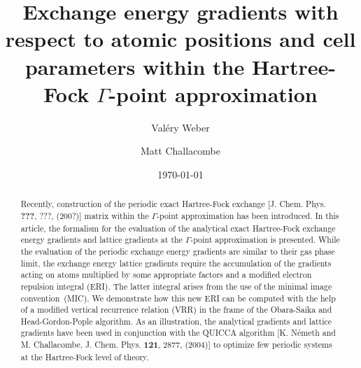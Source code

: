 \documentclass[prl,twocolumn,showpacs,twocolumngrid,superbib]{revtex4}
\begin{document}

\title{Exchange energy gradients with respect to atomic positions and cell parameters
  within the Hartree-Fock $\Gamma$-point approximation}

\author{Val\'ery Weber}
%
\author{Matt Challacombe}%
%

\date{\today}%

\begin{abstract}
  Recently, construction of the periodic exact Hartree-Fock exchange 
  [J. Chem. Phys. {\bf ???}, ???, (200?)]
  matrix within the $\Gamma$-point approximation
  has been introduced. In this article, the formalism for the evaluation of 
  the analytical exact Hartree-Fock exchange energy gradients and lattice gradients at 
  the $\Gamma$-point approximation is presented. While the evaluation of the
  periodic exchange energy gradients are similar to their gas phase limit, the exchange
  energy lattice gradients require the accumulation of the gradients acting on atoms multiplied 
  by some appropriate factors and a modified electron repulsion integral (ERI). The latter
  integral arises from the use of the minimal image convention~(MIC). We demonstrate how
  this new ERI can be computed with the help of a modified vertical 
  recurrence relation (VRR) in the frame of the Obara-Saika and Head-Gordon-Pople 
  algorithm.  As an illustration, the analytical gradients and lattice gradients have been used 
  in conjunction with the QUICCA algorithm [K. N\'emeth and M. Challacombe,
  J. Chem. Phys. {\bf 121}, 2877, (2004)] to optimize few periodic 
  systems at the Hartree-Fock level of theory.
\end{abstract}

\maketitle
\end{document}

